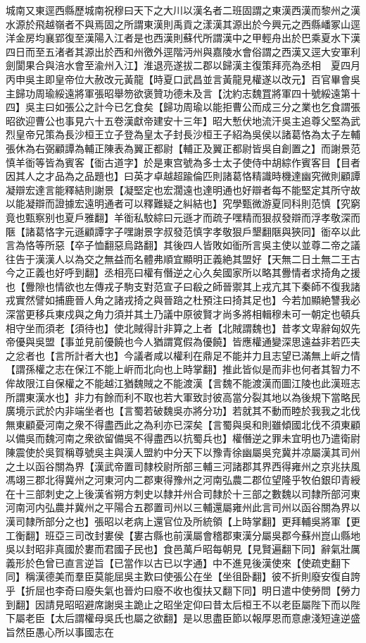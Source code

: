 城南又東逕西縣歷城南祝穆曰天下之大川以漢名者二班固謂之東漢西漢而黎州之漢水源於飛越嶺者不與焉固之所謂東漢則禹貢之漾漢其源出於今興元之西縣嶓冢山逕洋金房均襄郢復至漢陽入江者是也西漢則蘇代所謂漢中之甲輕舟出於巴乘夏水下漢四日而至五渚者其源出於西和州徼外逕階沔州與嘉陵水會俗謂之西漢又逕大安軍利劍閬果合與涪水會至渝州入江】淮退亮遂拔二郡以歸漢主復策拜亮為丞相　夏四月丙申吳主即皇帝位大赦改元黃龍【時夏口武昌並言黃龍見權遂以改元】百官畢會吳主歸功周瑜綏遠將軍張昭舉笏欲褒贊功德未及言【沈約志魏罝將軍四十號綏遠第十四】吳主曰如張公之計今已乞食矣【歸功周瑜以能拒曹公而成三分之業也乞食謂張昭欲迎曹公也事見六十五卷漢獻帝建安十三年】昭大慙伏地流汗吳主追尊父堅為武烈皇帝兄策為長沙桓王立子登為皇太子封長沙桓王子紹為吳侯以諸葛恪為太子左輔張休為右弼顧譚為輔正陳表為翼正都尉【輔正及翼正都尉皆吳自創置之】而謝景范慎羊衜等皆為賓客【衜古道字】於是東宫號為多士太子使侍中胡綜作賓客目【目者因其人之才品為之品題也】曰英才卓越超踰倫匹則諸葛恪精識時機達幽究微則顧譚凝辯宏達言能釋結則謝景【凝堅定也宏濶遠也達明通也好辯者每不能堅定其所守故以能凝辯而證據宏遠明通者可以釋難疑之糾結也】究學甄微游夏同科則范慎【究窮竟也甄察别也夏戶雅翻】羊衜私駮綜曰元遜才而疏子嘿精而狠叔發辯而浮孝敬深而陿【諸葛恪字元遜顧譚字子嘿謝景字叔發范慎字孝敬狠戶墾翻陿與狹同】衜卒以此言為恪等所惡【卒子恤翻惡烏路翻】其後四人皆敗如衜所言吳主使以並尊二帝之議往告于漢漢人以為交之無益而名體弗順宜顯明正義絶其盟好【天無二日土無二王古今之正義也好呼到翻】丞相亮曰權有僭逆之心久矣國家所以略其釁情者求掎角之援也【釁隙也情欲也左傳戎子駒支對范宣子曰殽之師晉禦其上戎亢其下秦師不復我諸戎實然譬如捕鹿晉人角之諸戎掎之與晉踣之杜預注曰掎其足也】今若加顯絶讐我必深當更移兵東戍與之角力須并其土乃議中原彼賢才尚多將相輯穆未可一朝定也頓兵相守坐而須老【須待也】使北賊得計非算之上者【北賊謂魏也】昔孝文卑辭匈奴先帝優與吳盟【事並見前優饒也今人猶謂寛假為優饒】皆應權通變深思遠益非若匹夫之忿者也【言所計者大也】今議者咸以權利在鼎足不能并力且志望已滿無上㟁之情【謂孫權之志在保江不能上㟁而北向也上時掌翻】推此皆似是而非也何者其智力不侔故限江自保權之不能越江猶魏賊之不能渡漢【言魏不能渡漢而圖江陵也此漢班志所謂東漢水也】非力有餘而利不取也若大軍致討彼高當分裂其地以為後規下當略民廣境示武於内非端坐者也【言蜀若破魏吳亦將分功】若就其不動而睦於我我之北伐無東顧憂河南之衆不得盡西此之為利亦已深矣【言蜀與吳和則雖傾國北伐不須東顧以備吳而魏河南之衆欲留備吳不得盡西以抗蜀兵也】權僭逆之罪未宜明也乃遣衛尉陳震使於吳賀稱尊號吳主與漢人盟約中分天下以豫青徐幽屬吳兖冀并凉屬漢其司州之土以函谷關為界【漢武帝置司隸校尉所部三輔三河諸郡其界西得雍州之京兆扶風馮翊三郡北得冀州之河東河内二郡東得豫州之河南弘農二郡位望隆乎牧伯銀印青綬在十三部刺史之上後漢省朔方刺史以隸并州合司隸於十三部之數魏以司隸所部河東河南河内弘農并冀州之平陽合五郡置司州以三輔還屬雍州此言司州以函谷關為界以漢司隸所部分之也】張昭以老病上還官位及所統領【上時掌翻】更拜輔吳將軍【更工衡翻】班亞三司改封婁侯【婁古縣也前漢屬會稽郡東漢分屬吳郡今蘇州崑山縣地吳以封昭非真國於婁而君國子民也】食邑萬戶昭每朝見【見賢遍翻下同】辭氣壯厲義形於色曾已直言逆旨【已當作以古已以字通】中不進見後漢使來【使疏吏翻下同】稱漢德美而羣臣莫能屈吳主歎曰使張公在坐【坐徂卧翻】彼不折則廢安復自誇乎【折屈也李奇曰廢失氣也晉灼曰廢不收也復扶又翻下同】明日遣中使勞問【勞力到翻】因請見昭昭避席謝吳主跪止之昭坐定仰曰昔太后桓王不以老臣屬陛下而以陛下屬老臣【太后謂權母吳氏也屬之欲翻】是以思盡臣節以報厚恩而意慮淺短違逆盛旨然臣愚心所以事國志在